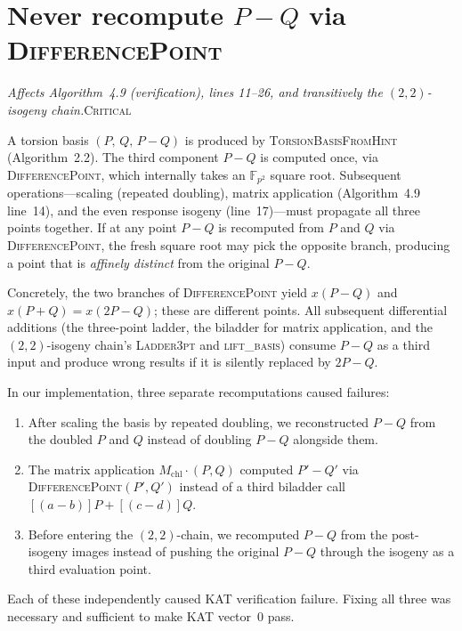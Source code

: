 \documentclass[a4paper,11pt]{article}
\newcommand{\algo}[1]{Algorithm~#1}
\newcommand{\Fpii}{\mathbb{F}_{p^2}}
\newcommand{\critical}{\textsc{\color{BrickRed}Critical}}
\newcommand{\finding}[2]{\noindent\textit{#1}\hfill#2\par\smallskip}
\begin{document}
\clearpage
\appendix

\section{Never recompute $P{-}Q$ via \textsc{DifferencePoint}}
\label{sec:pmq-recompute}

\finding{Affects \algo{4.9} (verification), lines 11--26,
and transitively the $(2,2)$-isogeny chain.}{\critical}

A torsion basis $(P,\, Q,\, P{-}Q)$ is produced by
\textsc{TorsionBasisFromHint} (\algo{2.2}).  The third component
$P{-}Q$ is computed once, via \textsc{DifferencePoint}, which
internally takes an $\Fpii$ square root.  Subsequent operations---scaling
(repeated doubling), matrix application (\algo{4.9} line~14), and the
even response isogeny (line~17)---must propagate all three points
together.  If at any point $P{-}Q$ is recomputed from $P$ and $Q$ via
\textsc{DifferencePoint}, the fresh square root may pick the opposite
branch, producing a point that is \emph{affinely distinct} from the
original $P{-}Q$.

Concretely, the two branches of \textsc{DifferencePoint} yield $x(P-Q)$
and $x(P+Q) = x(2P-Q)$; these are different points.  All subsequent
differential additions (the three-point ladder, the biladder for matrix
application, and the $(2,2)$-isogeny chain's \textsc{Ladder3pt} and
\textsc{lift\_basis}) consume $P{-}Q$ as a third input and produce wrong
results if it is silently replaced by $2P{-}Q$.

In our implementation, three separate recomputations caused failures:
\begin{enumerate}[nosep]
  \item After scaling the basis by repeated doubling, we reconstructed
        $P{-}Q$ from the doubled $P$ and $Q$ instead of doubling $P{-}Q$
        alongside them.
  \item The matrix application $M_{\mathrm{chl}} \cdot (P, Q)$ computed
        $P' - Q'$ via \textsc{DifferencePoint}$(P', Q')$ instead of a
        third biladder call $[(a{-}b)]P + [(c{-}d)]Q$.
  \item Before entering the $(2,2)$-chain, we recomputed
        $P{-}Q$ from the post-isogeny images instead of pushing the
        original $P{-}Q$ through the isogeny as a third evaluation point.
\end{enumerate}
Each of these independently caused KAT verification failure.  Fixing all
three was necessary and sufficient to make KAT vector~0 pass.
\end{document}
